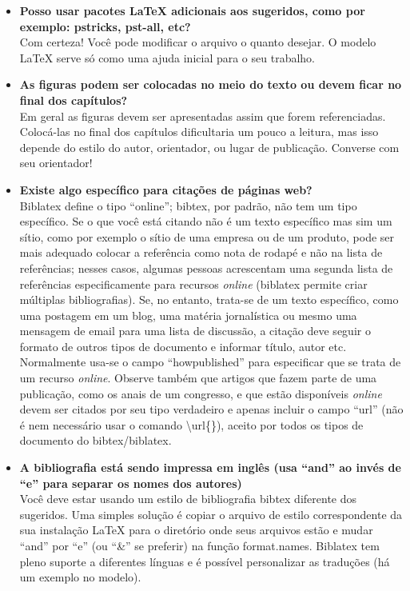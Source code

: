 \begin{itemize}

\item \textbf{Posso usar pacotes \LaTeX{} adicionais aos sugeridos, como por exemplo: pstricks, pst-all, etc?}\\
Com certeza! Você pode modificar o arquivo o quanto desejar. O modelo \LaTeX{} serve só como uma ajuda inicial para o seu trabalho.

\item \textbf{As figuras podem ser colocadas no meio do texto ou devem ficar no final dos capítulos?}\\
Em geral as figuras devem ser apresentadas assim que forem referenciadas. Colocá-las no final dos capítulos dificultaria um pouco a leitura, mas isso depende do estilo do autor, orientador, ou lugar de publicação. Converse com seu orientador!

\item \textbf{Existe algo específico para citações de páginas web?}\\
Biblatex define o tipo ``online''; bibtex, por padrão, não tem um tipo específico. Se o que você está citando não é um texto específico mas sim um sítio, como por exemplo o sítio de uma empresa ou de um produto, pode ser mais adequado colocar a referência como nota de rodapé e não na lista de referências; nesses casos, algumas pessoas acrescentam uma segunda lista de referências especificamente para recursos \emph{online} (biblatex  permite criar múltiplas bibliografias). Se, no entanto, trata-se de um texto específico, como uma postagem em um blog, uma matéria jornalística ou mesmo uma mensagem de email para uma lista de discussão, a citação deve seguir o formato de outros tipos de documento e informar título, autor etc. Normalmente usa-se o campo ``howpublished'' para especificar que se trata de um recurso \emph{online}. Observe também que artigos que fazem parte de uma publicação, como os anais de um congresso, e que estão disponíveis \emph{online} devem ser citados por seu tipo verdadeiro e apenas incluir o campo ``url'' (não é nem necessário usar o comando \textsf{\textbackslash{}url\{\}}), aceito por todos os tipos de documento do bibtex/biblatex.

\item \textbf{A bibliografia está sendo impressa em inglês (usa ``and'' ao invés de ``e'' para separar os nomes dos autores)}\\
Você deve estar usando um estilo de bibliografia bibtex diferente dos sugeridos. Uma simples solução é copiar o arquivo de estilo correspondente da sua instalação \LaTeX{} para o diretório onde seus arquivos estão e mudar ``and'' por ``e'' (ou ``\&'' se preferir) na função format.names. Biblatex tem pleno suporte a diferentes línguas e é possível personalizar as traduções (há um exemplo no modelo).


\end{itemize}
